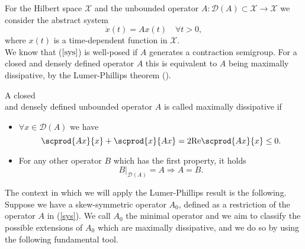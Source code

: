 \documentclass{ifacconf}
\begin{document}
For the Hilbert space $\mathcal{X}$ and the unbounded operator $A:\mathcal{D}(A)\subset \mathcal{X}\to \mathcal{X}$ we consider the abstract system
\begin{equation}\label{sys}
    \dot{x}(t)=Ax(t)\quad  \forall t>0,
\end{equation}
where $x(t)$ is a time-dependent function in $\mathcal{X}$.\\
We know that ($\ref{sys}$) is well-posed if $A$ generates a contraction semigroup. For a closed and densely defined operator $A$ this is equivalent to $A$ being maximally dissipative, by the Lumer-Phillips theorem (\cite{LPh:61}).
\begin{defn}
    A closed\\ and densely defined unbounded operator $A$ is called maximally dissipative if
    \begin{itemize}
        \item $\forall x\in \mathcal{D}(A)$ we have
        \[
            \scprod{Ax}{x}+\scprod{x}{Ax}=2\text{Re}\scprod{Ax}{x}\leq 0.
        \]
        \item For any other operator $B$ which has the first property, it holds
        \[ 
            B|_{\mathcal{D}(A)}=A\Rightarrow A=B.
        \]
    \end{itemize}
\end{defn}
The context in which we will apply the Lumer-Phillips result is the following. Suppose we have a skew-symmetric operator $A_0$, defined as a restriction of the operator $A$ in (\ref{sys}). We call $A_0$ the minimal operator and we aim to classify the possible extensions of $A_0$ which are maximally dissipative, and we do so by using the following fundamental tool.
\end{document}
